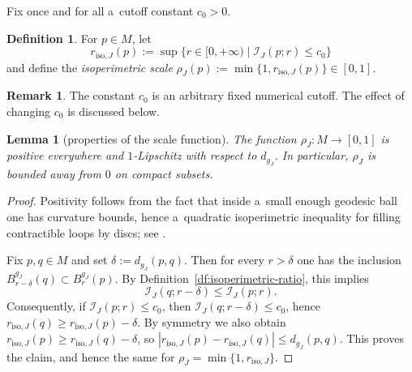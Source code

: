 \documentclass[10pt,a4paper]{amsart}
\numberwithin{equation}{section}
\newtheorem{lm}[Theorem]{Lemma}
\theoremstyle{definition}
\newtheorem{df}[Theorem]{Definition}
\newtheorem{rem}[Theorem]{Remark}
\begin{document}
Fix once and for all a~cutoff constant $c_0>0$.

\begin{df}\label{df:isoperimetric-scale}
For $p\in M$, let
\[
r_{\mathrm{iso},J}(p)
:=
\sup\{r\in[0,+\infty) \mid \mathcal{I}_J(p;r)\le c_0\}
\]
and define the \emph{isoperimetric scale}
$
\rho_J(p):=\min\{1,r_{\mathrm{iso},J}(p)\}\in[0,1]$.
\end{df}
\begin{rem}\label{rem:cutoff}
The constant $c_0$ is an arbitrary fixed numerical cutoff. The effect of changing $c_0$ is discussed below.
\end{rem}

\begin{lm}[properties of the scale function]\label{lem:rho-continuous}
The function $\rho_J\colon M\to[0,1]$ is positive everywhere and $1$-Lipschitz with respect to $d_{g_J}$.
In particular, $\rho_J$ is bounded away from $0$ on compact subsets.
\end{lm}
\begin{proof}
 Positivity follows from the fact that inside a~small enough geodesic ball one has curvature bounds, hence a~quadratic isoperimetric inequality for filling contractible loops by discs; see \cite[Theorem~4.4.1]{McDuffSalamonJHol}.

Fix $p,q\in M$ and set $\delta:=d_{g_J}(p,q)$. Then for every $r>\delta$ one has the inclusion $B^{g_J}_{r-\delta}(q)\subset B^{g_J}_{r}(p)$. By Definition~\ref{df:isoperimetric-ratio}, this implies
 \[
 \mathcal{I}_J(q;r-\delta) \le \mathcal{I}_J(p;r).
 \]
 Consequently, if $\mathcal{I}_J(p;r)\le c_0$, then $\mathcal{I}_J(q;r-\delta)\le c_0$, hence
 $
 r_{\mathrm{iso},J}(q)\ge r_{\mathrm{iso},J}(p)-\delta.
 $
 By symmetry we also obtain $r_{\mathrm{iso},J}(p)\ge r_{\mathrm{iso},J}(q)-\delta$, so
 $
 |r_{\mathrm{iso},J}(p)-r_{\mathrm{iso},J}(q)|\le d_{g_J}(p,q).
 $
 This proves the claim, and hence the same for $\rho_J=\min\{1,r_{\mathrm{iso},J}\}$.
 \end{proof}
\end{document}
